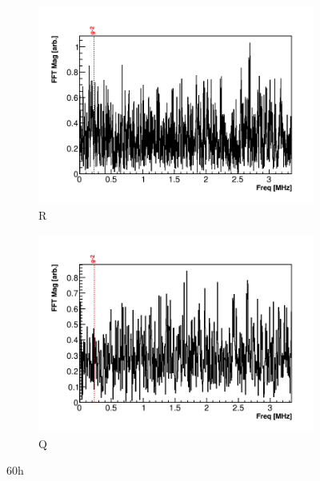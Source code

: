 \begin{figure}[]
    \begin{subfigure}[t]{0.45\textwidth}
        \centering
        \includegraphics[width=\textwidth]{FFT_RMethod}
        \caption{R}
    \end{subfigure}
    \hspace{1mm}
    \begin{subfigure}[t]{0.45\textwidth}
        \centering
        \includegraphics[width=\textwidth]{FFT_QMethod}
        \caption{Q}
    \end{subfigure}
\caption[]{60h}
\label{fig:}
\end{figure}


